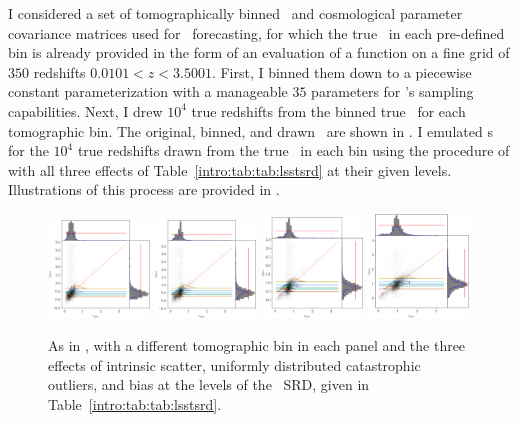 I considered a set of tomographically binned \nz\ and cosmological parameter covariance matrices used for \desc\ forecasting, for which the true \nz\ in each pre-defined bin is already provided in the form of an evaluation of a function on a fine grid of $350$ redshifts $0.0101 < z < 3.5001$.
First, I binned them down to a piecewise constant parameterization with a manageable $35$ parameters for \chippr's sampling capabilities.
Next, I drew $10^{4}$ true redshifts from the binned true \nz\ for each tomographic bin.
The original, binned, and drawn \nz\ are shown in .
I emulated \pzpdf s for the $10^{4}$ true redshifts drawn from the true \nz\ in each bin using the procedure of  with all three effects of Table~\ref{intro:tab:tab:lsstsrd} at their given levels.
Illustrations of this process are provided in .

\begin{figure}
	\begin{center}
		\includegraphics[width=0.24\textwidth]{figures/chippr/0single_lsst_mega_scatter.png}
		\includegraphics[width=0.24\textwidth]{figures/chippr/1single_lsst_mega_scatter.png}		\includegraphics[width=0.24\textwidth]{figures/chippr/2single_lsst_mega_scatter.png}
		\includegraphics[width=0.24\textwidth]{figures/chippr/3single_lsst_mega_scatter.png}
		\caption{As in , with a different tomographic bin in each panel and the three effects of intrinsic scatter, uniformly distributed catastrophic outliers, and bias at the levels of the \lsst\ SRD, given in Table~\ref{intro:tab:tab:lsstsrd}.
}
	\end{center}
\end{figure}

